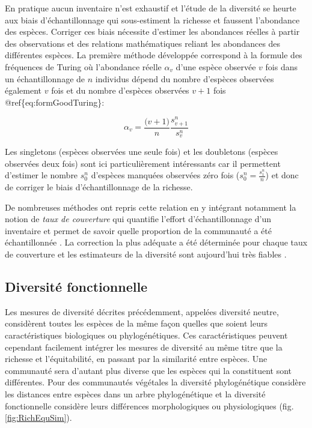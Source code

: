 \documentclass[
  11pt,
  french,
  A4paper,
  extrafontsizes,onecolumn,openright
  ]{memoir}
\begin{document}
En pratique aucun inventaire n'est exhaustif et l'étude de la diversité
se heurte aux biais d'échantillonnage qui sous-estiment la richesse et
faussent l'abondance des espèces. Corriger ces biais nécessite d'estimer
les abondances réelles à partir des observations et des relations
mathématiques reliant les abondances des différentes espèces. La
première méthode développée correspond à la formule des fréquences de
Turing \autocite{Good1953} où l'abondance réelle \(\alpha_v\) d'une
espèce observée \(v\) fois dans un échantillonnage de \(n\) individus
dépend du nombre d'espèces observées également \(v\) fois et du nombre
d'espèces observées \(v+1\) fois @ref\{eq:formGoodTuring\}:

\begin{equation}
\alpha_v=\frac{\big(v+1\big)}{n}\frac{s^n_{v+1}}{s^n_v}
\label{eq:formGoodTuring}
\end{equation}

Les singletons (espèces observées une seule fois) et les doubletons
(espèces observées deux fois) sont ici particulièrement intéressants car
il permettent d'estimer le nombre \(s^n_0\) d'espèces manquées observées
zéro fois (\(s^n_0=\frac{s^n_1}{n}\)) et donc de corriger le biais
d'échantillonnage de la richesse.

De nombreuses méthodes ont repris cette relation en y intégrant
notamment la notion de \emph{taux de couverture} qui quantifie l'effort
d'échantillonnage d'un inventaire et permet de savoir quelle proportion
de la communauté a été échantillonnée \autocite{Dauby2012}. La
correction la plus adéquate a été déterminée pour chaque taux de
couverture et les estimateurs de la diversité sont aujourd'hui très
fiables \autocites{Chao2015}{Marcon2015b}.

\subsection{Diversité fonctionnelle}\label{diversite-fonctionnelle}

Les mesures de diversité décrites précédemment, appelées diversité
neutre, considèrent toutes les espèces de la même façon quelles que
soient leurs caractéristiques biologiques ou phylogénétiques. Ces
caractéristiques peuvent cependant facilement intégrer les mesures de
diversité au même titre que la richesse et l'équitabilité, en passant
par la similarité entre espèces. Une communauté sera d'autant plus
diverse que les espèces qui la constituent sont différentes. Pour des
communautés végétales la diversité phylogénétique considère les
distances entre espèces dans un arbre phylogénétique et la diversité
fonctionnelle considère leurs différences morphologiques ou
physiologiques (fig.\ref{fig:RichEquSim}).
\end{document}
